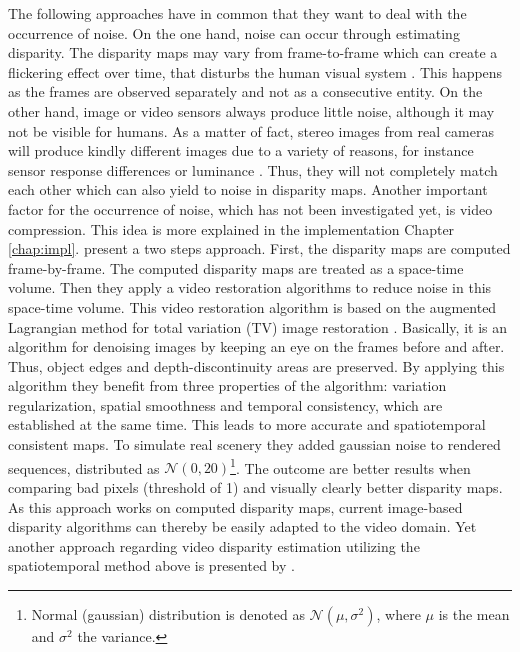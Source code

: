 The following approaches have in common that they want to deal with the occurrence of noise.
On the one hand, noise can occur through estimating disparity.
The disparity maps may vary from frame-to-frame which can create a flickering effect over time, that disturbs the human visual system \citep{khoshabeh2011spatio}.
This happens as the frames are observed separately and not as a consecutive entity.
On the other hand, image or video sensors always produce little noise, although it may not be visible for humans.
As a matter of fact, stereo images from real cameras will produce kindly different images due to a variety of reasons, for instance sensor response differences or luminance \citep{khoshabeh2011spatio, cyganek2011introduction}.
Thus, they will not completely match each other which can also yield to noise in disparity maps.
Another important factor for the occurrence of noise, which has not been investigated yet, is video compression.
This idea is more explained in the implementation Chapter \ref{chap:impl}.
\newline\newline\noindent \citeauthor{khoshabeh2011spatio} \citep{khoshabeh2011spatio} present a two steps approach.
First, the disparity maps are computed frame-by-frame.
The computed disparity maps are treated as a space-time volume.
Then they apply a video restoration algorithms to reduce noise in this space-time volume.
This video restoration algorithm is based on the augmented Lagrangian method for total variation (TV) image restoration \citep{chan2011augmented}.
Basically, it is an algorithm for denoising images by keeping an eye on the frames before and after.
Thus, object edges and depth-discontinuity areas are preserved.
By applying this algorithm they benefit from three properties of the algorithm: variation regularization, spatial smoothness and temporal consistency, which are established at the same time.
This leads to more accurate and spatiotemporal consistent maps.
To simulate real scenery they added gaussian noise to rendered sequences, distributed as $\mathcal{N}(0,20)$\footnote{Normal (gaussian) distribution is denoted as $\mathcal{N}(\mu,\sigma^2)$, where $\mu$ is the mean and $\sigma^2$ the variance.}.
The outcome are better results when comparing bad pixels (threshold of 1) and visually clearly better disparity maps.
As this approach works on computed disparity maps, current image-based disparity algorithms can thereby be easily adapted to the video domain.
\newline\newline\noindent Yet another approach regarding video disparity estimation utilizing the spatiotemporal method above is presented by \citeauthor{lee2012local} \citep{lee2012local}.
